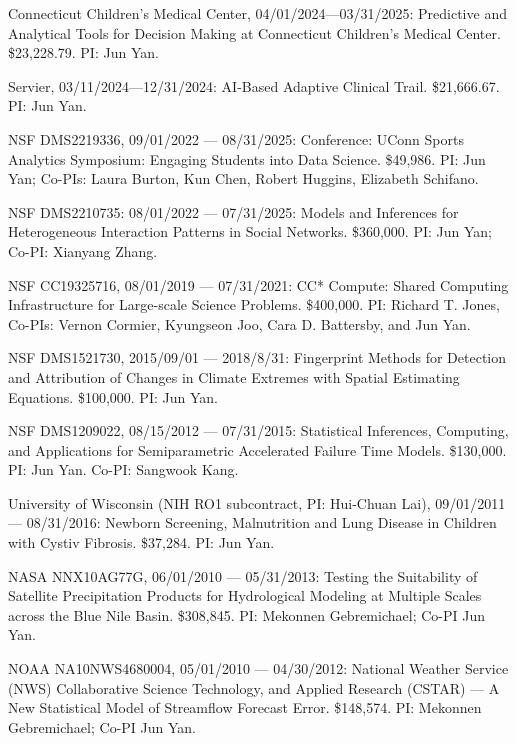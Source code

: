 \documentclass[Statistics]{vita}
\begin{document}
\begin{vita}
  \begin{Grants}
    \begin{External}
    \item Connecticut Children's Medical Center, 04/01/2024---03/31/2025: Predictive and Analytical Tools for Decision Making at Connecticut Children’s Medical Center. \$23,228.79. PI: Jun Yan.
    \item Servier, 03/11/2024---12/31/2024: AI-Based Adaptive Clinical Trail. \$21,666.67.  PI: Jun Yan.
    \item NSF DMS2219336, 09/01/2022 --- 08/31/2025: Conference: UConn Sports Analytics Symposium: Engaging Students into Data Science. \$49,986. PI: Jun Yan; Co-PIs: Laura Burton, Kun Chen,  Robert Huggins, Elizabeth Schifano.
    \item NSF DMS2210735: 08/01/2022 --- 07/31/2025: Models and Inferences for Heterogeneous Interaction Patterns in Social Networks. \$360,000. PI: Jun Yan; Co-PI: Xianyang Zhang.
    \item NSF CC19325716, 08/01/2019 --- 07/31/2021: CC* Compute: Shared Computing Infrastructure for Large-scale Science Problems. \$400,000. PI:  Richard T. Jones, Co-PIs: Vernon Cormier, Kyungseon Joo, Cara D. Battersby, and Jun Yan.
    \item NSF DMS1521730, 2015/09/01 --- 2018/8/31: Fingerprint Methods for Detection and Attribution of Changes in Climate Extremes with Spatial Estimating Equations. \$100,000. PI: Jun Yan.
    \item NSF DMS1209022, 08/15/2012 --- 07/31/2015: Statistical Inferences, Computing, and Applications for Semiparametric Accelerated Failure Time Models. \$130,000. PI: Jun Yan. Co-PI: Sangwook Kang.
    \item University of Wisconsin (NIH RO1 subcontract, PI: Hui-Chuan Lai), 09/01/2011 --- 08/31/2016: Newborn Screening, Malnutrition and Lung Disease in Children with Cystiv Fibrosis. \$37,284. PI: Jun Yan.
    \item NASA NNX10AG77G, 06/01/2010 --- 05/31/2013: Testing the Suitability of Satellite Precipitation Products for Hydrological Modeling at Multiple Scales across the Blue Nile Basin. \$308,845. PI: Mekonnen Gebremichael; Co-PI Jun Yan.
    \item NOAA NA10NWS4680004, 05/01/2010 --- 04/30/2012: National Weather Service (NWS) Collaborative Science Technology, and Applied Research (CSTAR) --- A New Statistical Model of Streamflow Forecast Error. \$148,574. PI: Mekonnen Gebremichael; Co-PI Jun Yan.

\end{External}
\end{Grants}
\end{vita}
\end{document}
